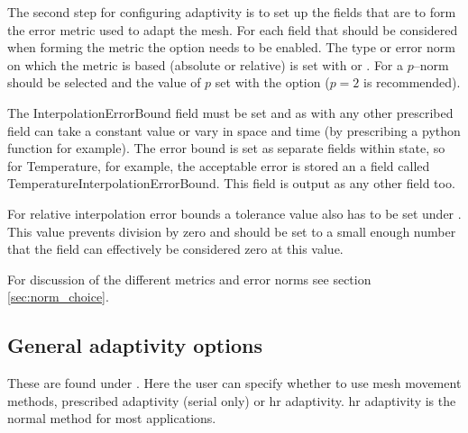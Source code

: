 The second step for configuring adaptivity is to set up the fields that are to form the error metric used
to adapt the mesh. For each field that should be considered when forming the metric the option
 needs to be enabled. The type or error norm on which the metric is based (absolute or relative) is set with  or . For a $p$--norm  should be selected and the value of $p$ set with the option  ($p=2$ is recommended).

The InterpolationErrorBound field must be set and as with any other prescribed field can take a constant value or vary in space and time (by prescribing a python function for example). The error bound is set as separate fields within 
state, so for Temperature, for example, the acceptable error is stored an a field called 
TemperatureInterpolationErrorBound. This field is output as any other field too.

For relative interpolation error bounds a tolerance value also has to be set under \newline
{}. This value prevents division by zero
and should be set to a small enough number that the field can effectively be considered zero at this value.

For discussion of the different metrics and error norms see section \ref{sec:norm_choice}.

\subsection{General adaptivity options}
\label{sec:configuring_fluidity_adaptivity_options}

These are found under . Here the user can specify whether to use mesh movement methods, 
prescribed adaptivity (serial only) or hr adaptivity. hr adaptivity is the normal method for most applications.

